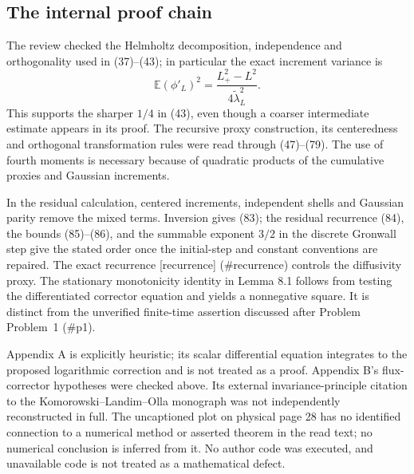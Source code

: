 \documentclass[10pt]{article}
\begin{document}
\subsection*{The internal proof chain}
The review checked the Helmholtz decomposition, independence and orthogonality used in (37)–(43); in particular the exact increment variance is \[\mathbb E(\phi'_L)^2
   =\frac{L_+^2-L^2}{4\widetilde\lambda_L^2}.\] This supports the sharper \(1/4\) in (43), even though a coarser intermediate estimate appears in its proof. The recursive proxy construction, its centeredness and orthogonal transformation rules were read through (47)–(79). The use of fourth moments is necessary because of quadratic products of the cumulative proxies and Gaussian increments.\par
In the residual calculation, centered increments, independent shells and Gaussian parity remove the mixed terms. Inversion gives (83); the residual recurrence (84), the bounds (85)–(86), and the summable exponent \(3/2\) in the discrete Gronwall step give the stated order once the initial-step and constant conventions are repaired. The exact recurrence [recurrence] (\#recurrence) controls the diffusivity proxy. The stationary monotonicity identity in Lemma 8.1 follows from testing the differentiated corrector equation and yields a nonnegative square. It is distinct from the unverified finite-time assertion discussed after Problem Problem 1 (\#p1).\par
Appendix A is explicitly heuristic; its scalar differential equation integrates to the proposed logarithmic correction and is not treated as a proof. Appendix B’s flux-corrector hypotheses were checked above. Its external invariance-principle citation to the Komorowski–Landim–Olla monograph was not independently reconstructed in full. The uncaptioned plot on physical page 28 has no identified connection to a numerical method or asserted theorem in the read text; no numerical conclusion is inferred from it. No author code was executed, and unavailable code is not treated as a mathematical defect.\par
\end{document}
